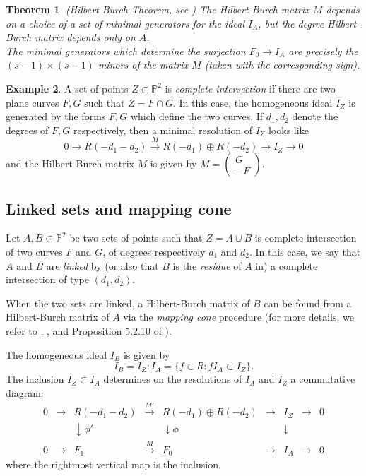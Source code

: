 \documentclass{amsart}
\newcommand{\Pj}{\mathbb{P}}
\newtheorem{thm0}{Theorem}[section]
\theoremstyle{definition}
\newtheorem{exa0}[thm0]{Example}
\begin{document}
\begin{thm0} \label{HBthm} (Hilbert-Burch Theorem, see \cite{CiGerOre88}) The Hilbert-Burch matrix $M$ depends on a choice of a set of 
minimal generators for the ideal $I_A$, but  the degree Hilbert-Burch matrix depends only on $A$.\\
The minimal generators which determine the surjection $F_0 \longrightarrow I_A$ are precisely the $(s-1)\times (s-1)$
minors of the matrix $M$ (taken with the corresponding sign). 
\end{thm0}

\begin{exa0}
A set of points $Z\subset\Pj^2$ is \emph{complete intersection} if there are two plane curves $F,G$ such that $Z=F\cap G$. In this case, the homogeneous ideal 
$I_{Z}$ is generated by the forms $F,G$ which define the two curves. If $d_1,d_2$ denote the degrees of $F,G$ respectively, then a minimal resolution
of $I_{Z}$ looks like
$$0 \longrightarrow R(-d_1-d_2)\xrightarrow M  R(-d_1)\oplus R(-d_2) \longrightarrow I_Z \longrightarrow 0$$
and the Hilbert-Burch matrix $ M$ is given by $M=\begin{pmatrix} G \\ -F \end{pmatrix}$.
\end{exa0}

\subsection{Linked sets and mapping cone}\label{sec:link}

Let $A,B\subset\Pj^2$ be two sets of points such that $Z=A\cup B$ is complete intersection of two curves $F$ and $G$, of degrees respectively $d_1$ and $d_2$. 
In this case, we say that $A$ and $B$ are \emph{linked} by (or also that $B$ is the \emph{residue} of $A$ in) a complete intersection of type $(d_1,d_2)$.

When the two sets are linked,  a Hilbert-Burch matrix of $B$ can be found from a Hilbert-Burch matrix of $A$ via the \emph{mapping cone} procedure (for more details, we refer to \cite{Ferrand75}, \cite{PeskineSzpiro74}, and Proposition 5.2.10 of \cite{Migliore}).

The homogeneous ideal $I_B$ is given by 
$$I_B=I_Z:I_A=\{ f\in R: fI_{A}\subset I_Z\}.$$
The inclusion $I_Z\subset I_A$ determines on the resolutions of $I_A$ and $I_Z$ a commutative diagram:
\begin{equation}\label{mc}
\begin{matrix}
0 & \longrightarrow & R(-d_1-d_2) & \xrightarrow  {M'} &  R(-d_1)\oplus R(-d_2) & \longrightarrow & I_Z &\longrightarrow & 0  \\
   &                            & \downarrow \phi' &                        & \downarrow    \phi         &                            &  \downarrow   &        &      \\
0 &\longrightarrow  & F_1               & \xrightarrow M     & F_0                                 & \longrightarrow & I_A &\longrightarrow & 0
\end{matrix}
\end{equation} 
where the rightmost vertical map is the inclusion.
\end{document}
